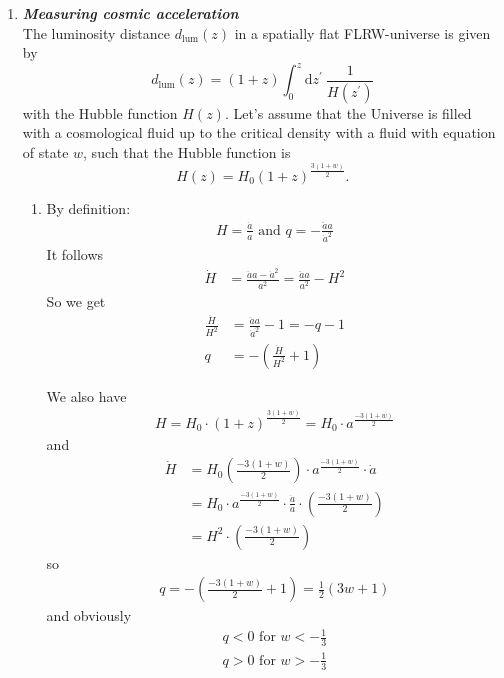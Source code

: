 \documentclass[a4paper,12pt]{article}
\newcommand{\question}[1]{\textbf{\textit{#1}}}
\begin{document}
\begin{enumerate}
		
		\item \question{Measuring cosmic acceleration}\\
		The luminosity distance $d_\mathrm{lum}(z)$ in a spatially flat FLRW-universe is given by
		\begin{equation}
		d_\mathrm{lum}(z) = (1+z)\int_0^z\mathrm{d}z^\prime\:\frac{1}{H(z^\prime)}
		\end{equation}
		with the Hubble function $H(z)$. Let's assume that the Universe is filled with a cosmological fluid up to the critical density with a fluid with equation of state $w$, such that the Hubble function is
		\begin{equation}
		H(z) = H_0 (1+z)^\frac{3(1+w)}{2}.
		\end{equation}
		\begin{enumerate}
			\item
					By definition:
					\begin{align*}
	H=\frac{\dot{a}}{a} \text{ and } q=-\frac{\ddot{a}a}{\dot{a}^2}
		\end{align*}
		It follows
		\begin{align*}
		\dot{H}&=\frac{\ddot{a}a-\dot{a}^2}{a^2}=\frac{\ddot{a}a}{a^2}-H^2		
		\end{align*}
		So we get
		\begin{align*}
		\frac{\dot{H}}{H^2}&=\frac{\ddot{a}a}{\dot{a}^2}-1=-q-1\\
		q&=-(\frac{\dot{H}}{H^2}+1)	
		\end{align*}
	
		
		We also have
		\begin{align*}
		H=H_0\cdot(1+z)^{\frac{3(1+w)}{2}}=H_0\cdot a^{\frac{-3(1+w)}{2}}
		\end{align*}
		and
		\begin{align*}
		\dot{H}&=H_0\left(\frac{-3(1+w)}{2}\right)\cdot a^{\frac{-3(1+w)}{2}}\cdot \dot{a}\\
			  &=H_0\cdot a^{\frac{-3(1+w)}{2}}\cdot\frac{\dot{a}}{a}\cdot\left(\frac{-3(1+w)}{2}\right)\\
			  &=H^2\cdot \left(\frac{-3(1+w)}{2}\right)
		\end{align*}	
		so
		\begin{align*}
		q=-\left(\frac{-3(1+w)}{2}+1\right)=\frac{1}{2}(3w+1)
		\end{align*}
		and obviously
		\begin{align*}
		q<0 \text{ for } w<-\frac{1}{3}\\
		q>0 \text{ for } w>-\frac{1}{3}
		\end{align*}	
										

\end{enumerate}
\end{enumerate}
\end{document}
